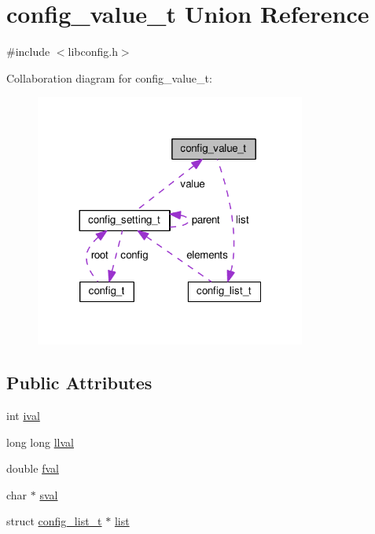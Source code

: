 \hypertarget{unionconfig__value__t}{\section{config\-\_\-value\-\_\-t Union Reference}
\label{unionconfig__value__t}
}


{\ttfamily \#include $<$libconfig.\-h$>$}



Collaboration diagram for config\-\_\-value\-\_\-t\-:\nopagebreak
\begin{figure}[H]
\begin{center}
\leavevmode
\includegraphics[width=252pt]{unionconfig__value__t__coll__graph}
\end{center}
\end{figure}
\subsection*{Public Attributes}
\begin{DoxyCompactItemize}
\item 
int \hyperlink{unionconfig__value__t_aa58090ef8528c7e35eb38c6ad23551e0}{ival}
\item 
long long \hyperlink{unionconfig__value__t_ac375626c7fff331cf0d1e866b033f20a}{llval}
\item 
double \hyperlink{unionconfig__value__t_a609c841d56ec29422ed61d12a90e7dfc}{fval}
\item 
char $\ast$ \hyperlink{unionconfig__value__t_a376d09b3da99952fcb1373b3574266ce}{sval}
\item 
struct \hyperlink{structconfig__list__t}{config\-\_\-list\-\_\-t} $\ast$ \hyperlink{unionconfig__value__t_a59f370b82f6ac0663825f8c90e12d63d}{list}
\end{DoxyCompactItemize}


